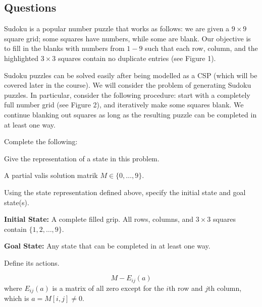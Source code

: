 \subsection{Questions}

\begin{listo}
    \item Sudoku is a popular number puzzle that works as follows: we are given a $9 \times 9$ square grid; some squares have numbers, while some are blank. Our objective is to fill in the blanks with numbers from $1 - 9$ such that each row, column, and the highlighted $3 \times 3$ squares contain no duplicate entries (see Figure 1).
    

    Sudoku puzzles can be solved easily after being modelled as a CSP (which will be covered later in the course). We will consider the problem of generating Sudoku puzzles. In particular, consider the following procedure: start with a completely full number grid (see Figure 2), and iteratively make some squares blank. We continue blanking out squares as long as the resulting puzzle can be completed in at least one way.

    Complete the following:
    
    \begin{listu}
        \item Give the representation of a state in this problem.

        \begin{solution}
            A partial valis solution matrik $M \in \{ 0, \dots, 9 \}$. 
        \end{solution}

        \item Using the state representation defined above, specify the initial state and goal state(s).

        \begin{solution}
            \null

            \textbf{Initial State:} A complete filled grip. All rows, columns, and $3 \times 3$ squares contain $\{ 1, 2, \dots, 9 \}$. 

            \textbf{Goal State:} Any state that can be completed in at least one way.
        \end{solution}

        \item Define its actions.

        \begin{solution}
            \[
                M - E_{ij}(a)
            \] where $E_{ij}(a)$ is a matrix of all zero except for the $i$th row and $j$th column, which is $a = M[i, j] \neq 0$.
        \end{solution}


\end{listu}
\end{listo}
